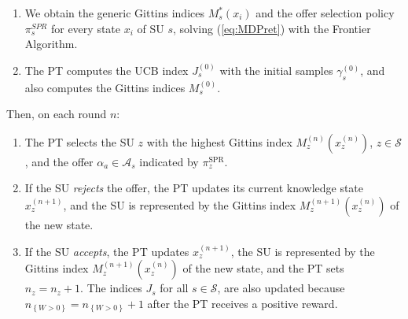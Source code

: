 \begin{enumerate}
\item We obtain the generic Gittins indices $M_s^*(x_i)$ and the offer selection policy $\pi_{s}^{SPR}$ for every state $x_i$ of SU $s$, solving (\ref{eq:MDPret}) with the Frontier Algorithm.
\item The PT computes the UCB index $J_s^{(0)}$ with the initial samples $\gamma_s^{(0)}$, and also computes the Gittins indices $M_s^{(0)}$.
\setcounter{enumTempB}{\theenumi}
\end{enumerate}
Then, on each round $n$:
\begin{enumerate}
\setcounter{enumi}{\theenumTempB}
\item The PT selects the SU $z$ with the highest Gittins index $M_z^{(n)}(x_z^{(n)})$, $z \in \mathcal{S}$, and the offer $\alpha_a \in \mathcal{A}_s$ indicated by $\pi_{z}^\text{SPR}$.
\item If the SU \textit{rejects} the offer, the PT updates its current knowledge state $x_{z}^{(n+1)}$, and the SU is represented by the Gittins index $M_z^{(n+1)}(x_z^{(n)})$ of the new state.
\item If the SU \textit{accepts}, the PT updates $x_{z}^{(n+1)}$, the SU is represented by the Gittins index $M_z^{(n+1)}(x_z^{(n)})$ of the new state, and the PT sets $n_{z}=n_{z}+1$. The indices $J_{s}$ for all $s\in\mathcal{S}$, are also updated because $n_{\left\{W>0\right\}}  = n_{\left\{W>0\right\}}+1$ after the PT receives a positive reward.
\end{enumerate}

